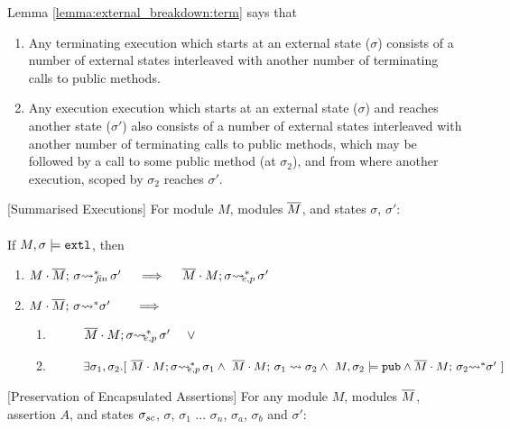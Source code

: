 {\vspace{.2cm}

Lemma \ref{lemma:external_breakdown:term} says that\\
\begin{enumerate}
\item
Any terminating execution which starts at an external state ($\sigma$) consists of a number of external states interleaved with another number of terminating calls to public methods.
\item
Any execution execution which starts at an external state ($\sigma$) and reaches another state ($\sigma'$) also consists of a number of external states interleaved with another number of terminating calls to public methods, which may be followed by a call to some public method (at $\sigma_2$), and from where another execution, scoped by $\sigma_2$  reaches $\sigma'$.
\end{enumerate}


 \begin{auxLemma}
\label{lemma:external_breakdown:term}[Summarised Executions]
For   module $M$, modules $\overline{M}$, and states $\sigma$, $\sigma'$:
\\
\\
If $M,\sigma \models \mbox{\normalfont{\texttt{extl}}}$, then
\begin{enumerate}
\item
$\leadstoBoundedStarFin {M\cdot \Mtwo}  {\sigma}  {\sigma'}  \ \ \  \ 
\Longrightarrow \ \ \  \ \leadstoBoundedExtPub {\Mtwo\cdot M}    {\sigma}  {\sigma'}$
\item
$M\cdot \overline{M};\, {\sigma} {\rightsquigarrow^*} \sigma'  \ \ \  \ \ \  
\Longrightarrow$ 

\begin{enumerate}
\item
$\strut \ \ \ \ \ \ \ \    \leadstoBoundedExtPub {\Mtwo\cdot M}    {\sigma}  {\sigma'}\ \ \ \  \vee$
\item
$\strut \ \ \ \ \ \ \ \    \exists \sigma_1,\sigma_2.[\ 
\leadstoBoundedExtPub {\Mtwo\cdot M}    {\sigma}  {\sigma_1} 
\wedge\ \leadstoBounded  {\Mtwo\cdot M}    {\sigma_1}  {\sigma_2} 
\wedge \ M, \sigma_2 \models \pubMeth \wedge \leadstoBoundedStar  {\Mtwo\cdot M}    {\sigma_2}  {\sigma'} \ ]
$
\end{enumerate}
\end{enumerate}
\end{auxLemma}
 



\begin{auxLemma}
\label{lemma:external_exec_preserves_more}[Preservation of Encapsulated Assertions]
For any module $M$, modules $\overline{M}$,  assertion  $A$, and 
 states $\sigma_{sc}$, $\sigma$, $\sigma_1$ ... $\sigma_n$, $\sigma_a$, $\sigma_b$ and $\sigma'$:


\end{auxLemma}}
